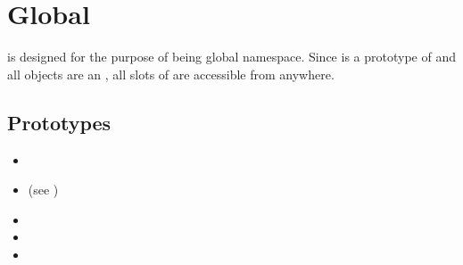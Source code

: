 
\section{Global}

 is designed for the purpose of being global
namespace. Since  is a prototype of  and all
objects are an , all slots of  are accessible from
anywhere.

\subsection{Prototypes}
\begin{itemize}
\item {}
\item {} (see )
\item {}
\item {}
\item {}
\end{itemize}

